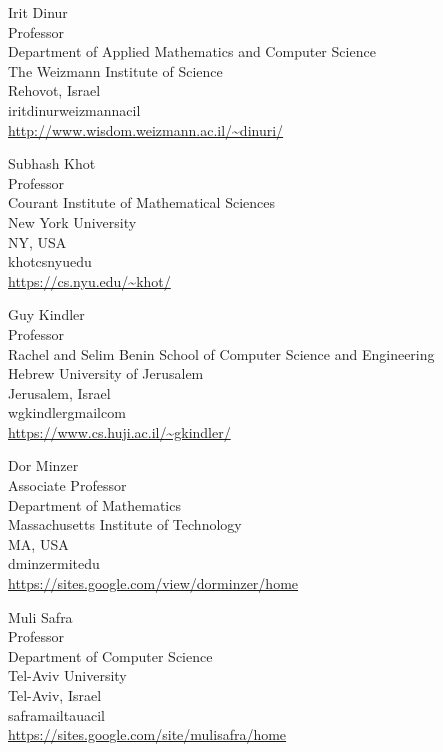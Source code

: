 \documentclass{toc}
\begin{document}
%
%
%
%
%
\begin{tocauthors}
\begin{tocinfo}[dinur]
Irit Dinur\\
Professor\\
Department of Applied Mathematics and Computer Science\\
The Weizmann Institute of Science\\
Rehovot, Israel\\
irit\tocdot{}dinur\tocat{}weizmann\tocdot{}ac\tocdot{}il\\
\url{http://www.wisdom.weizmann.ac.il/~dinuri/}
\end{tocinfo}
\begin{tocinfo}[khot]
 Subhash Khot\\
 Professor\\
 Courant Institute of Mathematical Sciences\\
 New York University\\
 NY, USA\\
 khot\tocat{}cs\tocdot{}nyu\tocdot{}edu \\   %
 \url{https://cs.nyu.edu/~khot/}      %
\end{tocinfo}
\begin{tocinfo}[kindler]
Guy Kindler\\
Professor\\
Rachel and Selim Benin School of Computer Science and Engineering\\
Hebrew University of Jerusalem\\
Jerusalem, Israel\\
wgkindler\tocat{}gmail\tocdot{}com\\
\url{https://www.cs.huji.ac.il/~gkindler/}
\end{tocinfo}
\begin{tocinfo}[minzer]
  Dor Minzer\\
  Associate Professor\\ %
  Department of Mathematics\\
  Massachusetts Institute of Technology\\
  MA, USA\\
  dminzer\tocat{}mit\tocdot{}edu \\
  \url{https://sites.google.com/view/dorminzer/home}
\end{tocinfo}
\begin{tocinfo}[safra]
  Muli Safra\\
  Professor\\
  Department of Computer Science\\
  Tel-Aviv University\\
  Tel-Aviv, Israel\\
  safra\tocat{}mail\tocdot{}tau\tocdot{}ac\tocdot{}il\\
  \url{https://sites.google.com/site/mulisafra/home}
\end{tocinfo}
\end{tocauthors}
\end{document}
